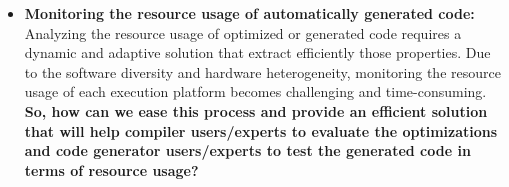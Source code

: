 \begin{itemize}
	\item \textbf{Monitoring the resource usage of automatically generated code:} 
	Analyzing the resource usage of optimized or generated code requires a dynamic and adaptive solution that extract efficiently those properties. Due to the software diversity and hardware heterogeneity, monitoring the resource usage of each execution platform becomes challenging and time-consuming. 	
	\textbf{So, how can we ease this process and provide an efficient solution that will help compiler users/experts to evaluate the optimizations and code generator users/experts to test the generated code in terms of resource usage?}
	

	

\end{itemize}


%

